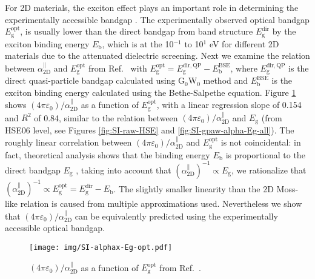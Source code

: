 \documentclass[manuscript=suppinfo,email=true,hyperref=true,keywords=false]{achemso}
\begin{document}
For 2D materials, the exciton effect plays an important role in
determining the experimentally accessible bandgap
\cite{Arnaud_2006_exc_hBN,Pulci_2014,Ramasubramaniam_2012,Chernikov_2014_EB_MoS2_2D3D}. The
experimentally observed optical bandgap
$E_{\mathrm{g}}^{\mathrm{opt}}$, is usually lower than the direct
bandgap from band structure $E_{\mathrm{g}}^{\mathrm{dir}}$ by the
exciton binding energy $E_{\mathrm{b}}$, which is at the 10$^{-1}$ to
10$^{1}$ eV for different 2D materials due to the attenuated
dielectric screening. Next we examine the relation between
$\alpha_{\mathrm{2D}}^{\parallel}$ and $E_{\mathrm{g}}^{\mathrm{opt}}$
from Ref.~ with
$E_{\mathrm{g}}^{\mathrm{opt}}=E_{\mathrm{g}}^{\mathrm{dir,QP}}-E_{\mathrm{b}}^{\mathrm{BSE}}$,
where $E_{\mathrm{g}}^{\mathrm{dir,QP}}$ is the direct quasi-particle
bandgap calculated using G$_0$W$_0$ method and
$E_{\mathrm{b}}^{\mathrm{BSE}}$ is the exciton binding energy
calculated using the Bethe-Salpethe equation. Figure \ref{fig:opt}
shows $(4\pi\varepsilon_{0})/\alpha_{\mathrm{2D}}^{\parallel}$ as a
function of $E_{\mathrm{g}}^{\mathrm{opt}}$, with a linear regression
slope of 0.154 and $R^{2}$ of 0.84, similar to the relation between
$(4\pi \varepsilon_{0})/\alpha_{\mathrm{2D}}^{\parallel}$ and
$E_{\mathrm{g}}$ (from HSE06 level, see Figures \ref{fig:SI-raw-HSE}
and \ref{fig:SI-gpaw-alpha-Eg-all}). The roughly linear correlation
between $(4\pi \varepsilon_{0})/\alpha_{\mathrm{2D}}^{\parallel}$ and
$E_{\mathrm{g}}^{\mathrm{opt}}$ is not coincidental: in fact,
theoretical analysis shows that the binding energy $E_{\mathrm{b}}$ is
proportional to the direct bandgap $E_{\mathrm{g}}$
\cite{Jiang_2017_Eg_Eb}, taking into account that
$(\alpha_{\mathrm{2D}}^{\parallel})^{-1} \propto E_{\mathrm{g}}$, we
rationalize that
$(\alpha_{\mathrm{2D}}^{\parallel})^{-1} \propto
E_{\mathrm{g}}^{\mathrm{opt}}=E_{\mathrm{g}}^{\mathrm{dir}}-E_{\mathrm{b}}$. The
slightly smaller linearity than the 2D Moss-like relation is caused
from multiple approximations used. Nevertheless we show that
$(4\pi\varepsilon_{0})/\alpha_{\mathrm{2D}}^{\parallel}$ can be
equivalently predicted using the experimentally accessible optical
bandgap.

\begin{figure}[htbp]
  \centering
  \texttt{[image: img/SI-alphax-Eg-opt.pdf]}
  \caption{$(4\pi\varepsilon_{0})/\alpha_{\mathrm{2D}}^{\parallel}$ as a function of
    $E_{\mathrm{g}}^{\mathrm{opt}}$ from Ref.~.}
  \label{fig:opt}
\end{figure}
\end{document}
